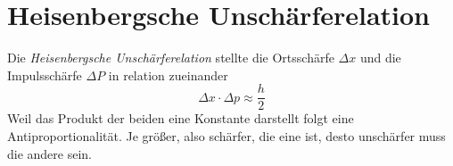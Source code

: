 \documentclass{article}
\begin{document}
\section{Heisenbergsche Unschärferelation}
Die \emph{Heisenbergsche Unschärferelation} stellte die Ortsschärfe $\Delta x$ und die Impulsschärfe $\Delta P$ in relation zueinander
\[
 \Delta x \cdot \Delta p \approx \frac{h}{2} 
\]
Weil das Produkt der beiden eine Konstante darstellt folgt eine Antiproportionalität. Je größer, also schärfer, die eine ist, desto unschärfer muss die andere sein. 
\end{document}
